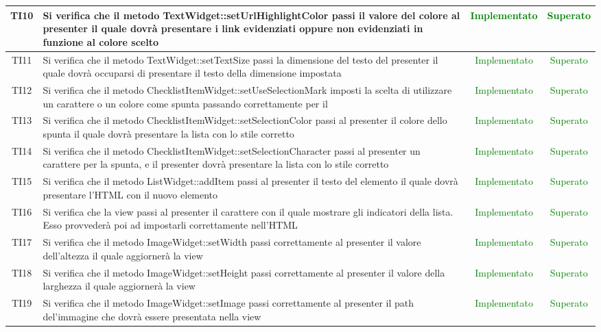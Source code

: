 \begin{center}
\begin{longtable}{|c|>{\centering}m{10cm}|c|c|}
		TI10 & Si verifica che il metodo TextWidget::setUrlHighlightColor passi il valore del colore al presenter il quale dovrà presentare i link evidenziati oppure non evidenziati in funzione al colore scelto & \textcolor{Green}{Implementato} & \textcolor{Green}{Superato} \\ \hline
		TI11 & Si verifica che il metodo TextWidget::setTextSize passi la dimensione del testo del presenter il quale dovrà occuparsi di presentare il testo della dimensione impostata & \textcolor{Green}{Implementato} & \textcolor{Green}{Superato} \\ \hline
		TI12 & Si verifica che il metodo ChecklistItemWidget::setUseSelectionMark imposti la scelta di utilizzare un carattere o un colore come spunta passando correttamente per il \termine{Presenter} & \textcolor{Green}{Implementato} & \textcolor{Green}{Superato} \\ \hline
		TI13 & Si verifica che il metodo ChecklistItemWidget::setSelectionColor passi al presenter il colore dello spunta il quale dovrà presentare la lista con lo stile corretto & \textcolor{Green}{Implementato} & \textcolor{Green}{Superato} \\ \hline
		TI14 & Si verifica che il metodo ChecklistItemWidget::setSelectionCharacter passi al presenter un carattere per la spunta, e il presenter dovrà presentare la lista con lo stile corretto & \textcolor{Green}{Implementato} & \textcolor{Green}{Superato} \\ \hline
		TI15 & Si verifica che il metodo ListWidget::addItem passi al presenter il testo del elemento il quale dovrà presentare l'HTML con il nuovo elemento & \textcolor{Green}{Implementato} & \textcolor{Green}{Superato} \\ \hline
		TI16 & Si verifica che la view passi al presenter il carattere con il quale mostrare gli indicatori della lista. Esso provvederà poi ad impostarli correttamente nell'HTML & \textcolor{Green}{Implementato} & \textcolor{Green}{Superato} \\ \hline
		TI17 & Si verifica che il metodo ImageWidget::setWidth passi correttamente al presenter il valore dell'altezza il quale aggiornerà la view & \textcolor{Green}{Implementato} & \textcolor{Green}{Superato} \\ \hline
		TI18 & Si verifica che il metodo ImageWidget::setHeight passi correttamente al presenter il valore della larghezza il quale aggiornerà la view & \textcolor{Green}{Implementato} & \textcolor{Green}{Superato} \\ \hline
		TI19 & Si verifica che il metodo ImageWidget::setImage passi correttamente al presenter il path del'immagine che dovrà essere presentata nella view & \textcolor{Green}{Implementato} & \textcolor{Green}{Superato} \\ \hline

\end{longtable}
\end{center}
